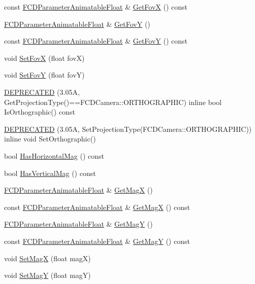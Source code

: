 \begin{DoxyCompactItemize}
\item 
const \hyperlink{classFCDParameterAnimatableT}{FCDParameterAnimatableFloat} \& \hyperlink{classFCDCamera_a2a16b1432904b518c25e4f5c96c79ca3}{GetFovX} () const 
\item 
\hyperlink{classFCDParameterAnimatableT}{FCDParameterAnimatableFloat} \& \hyperlink{classFCDCamera_a1b8d137f1a175ed595f1909b2d081d1c}{GetFovY} ()
\item 
const \hyperlink{classFCDParameterAnimatableT}{FCDParameterAnimatableFloat} \& \hyperlink{classFCDCamera_a0e8362765dede7db889296b708ac48f5}{GetFovY} () const 
\item 
void \hyperlink{classFCDCamera_a6288922e48ed1426edeeee4cb727a1e5}{SetFovX} (float fovX)
\item 
void \hyperlink{classFCDCamera_a833fe15b9b9186f3946bfc8c2f721e5c}{SetFovY} (float fovY)
\item 
\hyperlink{classFCDCamera_a85c12fce7991d68d04f3e458cd33b1c2}{DEPRECATED} (3.05A, GetProjectionType()==FCDCamera::ORTHOGRAPHIC) inline bool IsOrthographic() const 
\item 
\hyperlink{classFCDCamera_a69f9b90e16ce159cc104b4f5f0b92053}{DEPRECATED} (3.05A, SetProjectionType(FCDCamera::ORTHOGRAPHIC)) inline void SetOrthographic()
\item 
bool \hyperlink{classFCDCamera_a8e6652d9695b24aa398b0ab6bb408ecb}{HasHorizontalMag} () const 
\item 
bool \hyperlink{classFCDCamera_a4eddec2fc3082c106b417632103dbe51}{HasVerticalMag} () const 
\item 
\hyperlink{classFCDParameterAnimatableT}{FCDParameterAnimatableFloat} \& \hyperlink{classFCDCamera_a9c24ccb56d566c7bfd0cf884e785f807}{GetMagX} ()
\item 
const \hyperlink{classFCDParameterAnimatableT}{FCDParameterAnimatableFloat} \& \hyperlink{classFCDCamera_a688443be783987a85492568fbed75ef1}{GetMagX} () const 
\item 
\hyperlink{classFCDParameterAnimatableT}{FCDParameterAnimatableFloat} \& \hyperlink{classFCDCamera_a08aeea7cfca052b87a596ac1a559b465}{GetMagY} ()
\item 
const \hyperlink{classFCDParameterAnimatableT}{FCDParameterAnimatableFloat} \& \hyperlink{classFCDCamera_a896b2113cc9ea603932518e9423cdc83}{GetMagY} () const 
\item 
void \hyperlink{classFCDCamera_a6dad0e3978aad3bbd920587ae387e952}{SetMagX} (float magX)
\item 
void \hyperlink{classFCDCamera_a4edf1eb03fe522145a18d80aabcef450}{SetMagY} (float magY)

\end{DoxyCompactItemize}
